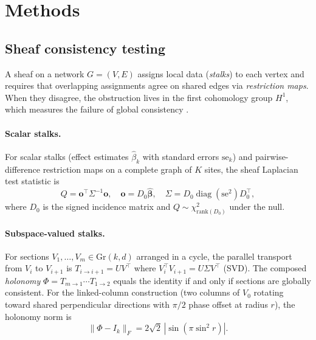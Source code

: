 \documentclass{article}
\newcommand{\Gr}{\mathrm{Gr}}
\begin{document}
\section{Methods}
\label{sec:methods}

\subsection{Sheaf consistency testing}
\label{sec:meth-sheaf}

A sheaf on a network $G = (V, E)$ assigns local data (\emph{stalks}) to each vertex and requires that overlapping assignments agree on shared edges via \emph{restriction maps}.
When they disagree, the obstruction lives in the first cohomology group $H^1$, which measures the failure of global consistency \citep{curry2014sheaves, robinson2014topological}.

\paragraph{Scalar stalks.}
For scalar stalks (effect estimates $\hat\beta_k$ with standard errors $\mathrm{se}_k$) and pairwise-difference restriction maps on a complete graph of $K$ sites, the sheaf Laplacian test statistic is
\begin{equation}
    Q = \mathbf{o}^\top \Sigma^{-1} \mathbf{o}, \quad
    \mathbf{o} = D_0 \boldsymbol{\hat\beta}, \quad
    \Sigma = D_0 \operatorname{diag}(\mathrm{se}^2) D_0^\top,
    \label{eq:sheaf-Q}
\end{equation}
where $D_0$ is the signed incidence matrix and $Q \sim \chi^2_{\mathrm{rank}(D_0)}$ under the null.

\paragraph{Subspace-valued stalks.}
For sections $V_1, \ldots, V_m \in \Gr(k,d)$ arranged in a cycle, the parallel transport from $V_i$ to $V_{i+1}$ is $T_{i \to i+1} = U V^\top$ where $V_i^\top V_{i+1} = U \Sigma V^\top$ (SVD).
The composed \emph{holonomy} $\Phi = T_{m \to 1} \cdots T_{1 \to 2}$ equals the identity if and only if sections are globally consistent.
For the linked-column construction (two columns of $V_0$ rotating toward shared perpendicular directions with $\pi/2$ phase offset at radius $r$), the holonomy norm is
\begin{equation}\label{eq:berry}
    \|\Phi - I_k\|_F = 2\sqrt{2}\,|\sin(\pi \sin^2 r)|.
\end{equation}
\end{document}
